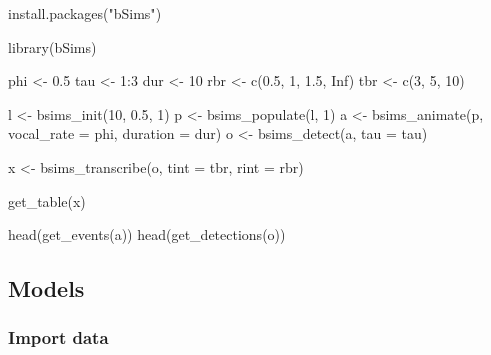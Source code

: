 \documentclass[
]{article}
\newenvironment{Shaded}{\begin{snugshade}}{\end{snugshade}}
\newcommand{\AttributeTok}[1]{\textcolor[rgb]{0.77,0.63,0.00}{#1}}
\newcommand{\ConstantTok}[1]{\textcolor[rgb]{0.00,0.00,0.00}{#1}}
\newcommand{\DecValTok}[1]{\textcolor[rgb]{0.00,0.00,0.81}{#1}}
\newcommand{\FloatTok}[1]{\textcolor[rgb]{0.00,0.00,0.81}{#1}}
\newcommand{\FunctionTok}[1]{\textcolor[rgb]{0.00,0.00,0.00}{#1}}
\newcommand{\NormalTok}[1]{#1}
\newcommand{\OtherTok}[1]{\textcolor[rgb]{0.56,0.35,0.01}{#1}}
\newcommand{\SpecialCharTok}[1]{\textcolor[rgb]{0.00,0.00,0.00}{#1}}
\newcommand{\StringTok}[1]{\textcolor[rgb]{0.31,0.60,0.02}{#1}}
\begin{document}
\begin{Shaded}
\begin{Highlighting}[]
\FunctionTok{install.packages}\NormalTok{(}\StringTok{"bSims"}\NormalTok{)}
\end{Highlighting}
\end{Shaded}

\begin{Shaded}
\begin{Highlighting}[]
\FunctionTok{library}\NormalTok{(bSims)}

\NormalTok{phi }\OtherTok{\textless{}{-}} \FloatTok{0.5}
\NormalTok{tau }\OtherTok{\textless{}{-}} \DecValTok{1}\SpecialCharTok{:}\DecValTok{3}
\NormalTok{dur }\OtherTok{\textless{}{-}} \DecValTok{10}
\NormalTok{rbr }\OtherTok{\textless{}{-}} \FunctionTok{c}\NormalTok{(}\FloatTok{0.5}\NormalTok{, }\DecValTok{1}\NormalTok{, }\FloatTok{1.5}\NormalTok{, }\ConstantTok{Inf}\NormalTok{)}
\NormalTok{tbr }\OtherTok{\textless{}{-}} \FunctionTok{c}\NormalTok{(}\DecValTok{3}\NormalTok{, }\DecValTok{5}\NormalTok{, }\DecValTok{10}\NormalTok{)}

\NormalTok{l }\OtherTok{\textless{}{-}} \FunctionTok{bsims\_init}\NormalTok{(}\DecValTok{10}\NormalTok{, }\FloatTok{0.5}\NormalTok{, }\DecValTok{1}\NormalTok{)}
\NormalTok{p }\OtherTok{\textless{}{-}} \FunctionTok{bsims\_populate}\NormalTok{(l, }\DecValTok{1}\NormalTok{)}
\NormalTok{a }\OtherTok{\textless{}{-}} \FunctionTok{bsims\_animate}\NormalTok{(p, }\AttributeTok{vocal\_rate =}\NormalTok{ phi, }\AttributeTok{duration =}\NormalTok{ dur)}
\NormalTok{o }\OtherTok{\textless{}{-}} \FunctionTok{bsims\_detect}\NormalTok{(a, }\AttributeTok{tau =}\NormalTok{ tau)}

\NormalTok{x }\OtherTok{\textless{}{-}} \FunctionTok{bsims\_transcribe}\NormalTok{(o, }\AttributeTok{tint =}\NormalTok{ tbr, }\AttributeTok{rint =}\NormalTok{ rbr)}

\FunctionTok{get\_table}\NormalTok{(x)}


\FunctionTok{head}\NormalTok{(}\FunctionTok{get\_events}\NormalTok{(a))}
\FunctionTok{head}\NormalTok{(}\FunctionTok{get\_detections}\NormalTok{(o))}
\end{Highlighting}
\end{Shaded}

\hypertarget{models}{%
\subsection{Models}\label{models}}

\hypertarget{import-data}{%
\subsubsection{Import data}\label{import-data}}
\end{document}
